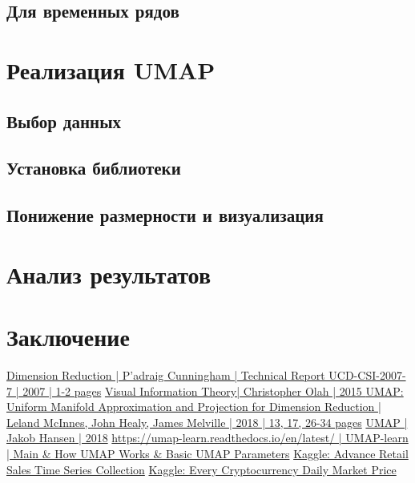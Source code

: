 \documentclass[a4paper, 12pt]{article}
\begin{document}
	\subsection{Для временных рядов}
	
	\newpage
	
	\section{Реализация UMAP}
	\subsection{Выбор данных}
	
	\subsection{Установка библиотеки}
	
	\subsection{Понижение размерности и визуализация}
	
	\newpage
	
	\section{Анализ результатов}
	
	\newpage
	
	\section{Заключение}
	
	\newpage
	
	\begin{thebibliography}{99}
		\href{http://citeseerx.ist.psu.edu/viewdoc/download?doi=10.1.1.98.1478&rep=rep1&type=pdf}{Dimension Reduction | P'adraig Cunningham | Technical Report UCD-CSI-2007-7 | 2007 | 1-2 pages}
		\href{http://colah.github.io/posts/2015-09-Visual-Information/}{Visual Information Theory| Christopher Olah | 2015 }
		\href{https://arxiv.org/pdf/1802.03426.pdf}{UMAP: Uniform Manifold Approximation and Projection for Dimension Reduction | Leland McInnes, John Healy, James Melville | 2018 | 13, 17, 26-34 pages}
		\href{https://umap-learn.readthedocs.io/en/latest/api.html}{UMAP | Jakob Hansen | 2018}
		\href{https://umap-learn.readthedocs.io/en/latest/how_umap_works.html}{https://umap-learn.readthedocs.io/en/latest/ | UMAP-learn | Main \& How UMAP Works \& Basic UMAP Parameters}
		\href{https://www.kaggle.com/census/advance-retail-sales-time-series-collection}{Kaggle: Advance Retail Sales Time Series Collection}
		\href{https://www.kaggle.com/jessevent/all-crypto-currencies}{Kaggle: Every Cryptocurrency Daily Market Price}
	\end{thebibliography}
\end{document}

